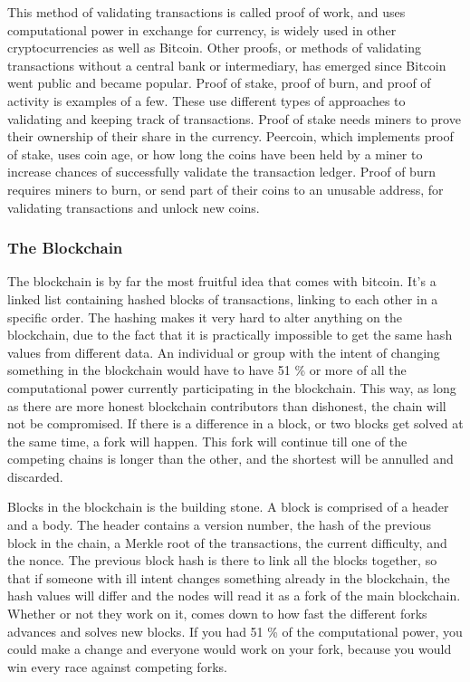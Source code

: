 \documentclass[11pt]{article}
\begin{document}
This method of validating transactions is called proof of work, and uses computational power in exchange for currency, is widely used in other cryptocurrencies as well as Bitcoin. Other proofs, or methods of validating transactions without a central bank or intermediary, has emerged since Bitcoin went public and became popular. Proof of stake, proof of burn, and proof of activity is examples of a few. These use different  types of approaches to validating and keeping track of transactions. Proof of stake needs miners to prove their ownership of their share in the currency. Peercoin, which implements proof of stake, uses coin age, or how long the coins have been held by a miner to increase chances of successfully validate the transaction ledger. Proof of burn requires miners to burn, or send part of their coins to an unusable address, for validating transactions and unlock new coins. 

\subsubsection{The Blockchain}

The blockchain is by far the most fruitful idea that comes with bitcoin. It's a linked list containing hashed blocks of transactions, linking to each other in a specific order. The hashing makes it very hard to alter anything on the blockchain, due to the fact that it is practically impossible to get the same hash values from different data. An individual or group with the intent of changing something in the blockchain would have to have 51 \% or more of all the computational power currently participating in the blockchain. This way, as long as there are more honest blockchain contributors than dishonest, the chain will not be compromised. If there is a difference in a block, or two blocks get solved at the same time, a fork will happen. This fork will continue till one of the competing chains is longer than the other, and the shortest will be annulled and discarded. 

Blocks in the blockchain is the building stone. A block is comprised of a header and a body. The header contains a version number, the hash of the previous block in the chain, a Merkle root of the transactions, the current difficulty, and the nonce. The previous block hash is there to link all the blocks together, so that if someone with ill intent changes something already in the blockchain, the hash values will differ and the nodes will read it as a fork of the main blockchain. Whether or not they work on it, comes down to how fast the different forks advances and solves new blocks. If you had 51 \% of the computational power, you could make a change and everyone would work on your fork, because you would win every race against competing forks.
\end{document}
